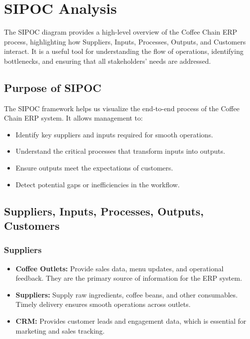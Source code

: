\chapter{SIPOC Analysis}

The SIPOC diagram provides a high-level overview of the Coffee Chain ERP process, highlighting how Suppliers, Inputs, Processes, Outputs, and Customers interact. It is a useful tool for understanding the flow of operations, identifying bottlenecks, and ensuring that all stakeholders’ needs are addressed.

\section*{Purpose of SIPOC}
The SIPOC framework helps us visualize the end-to-end process of the Coffee Chain ERP system. It allows management to:
\begin{itemize}
    \item Identify key suppliers and inputs required for smooth operations.
    \item Understand the critical processes that transform inputs into outputs.
    \item Ensure outputs meet the expectations of customers.
    \item Detect potential gaps or inefficiencies in the workflow.
\end{itemize}

\section*{Suppliers, Inputs, Processes, Outputs, Customers}

\subsection*{Suppliers}
\begin{itemize}
    \item \textbf{Coffee Outlets:} Provide sales data, menu updates, and operational feedback. They are the primary source of information for the ERP system.
    \item \textbf{Suppliers:} Supply raw ingredients, coffee beans, and other consumables. Timely delivery ensures smooth operations across outlets.
    \item \textbf{CRM:} Provides customer leads and engagement data, which is essential for marketing and sales tracking.
\end{itemize}

